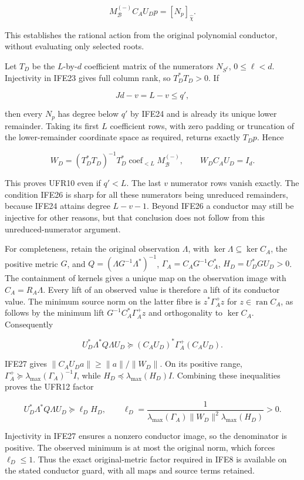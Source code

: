 \documentclass[11pt]{article}
\begin{document}
\[
M_{\mathcal B}^{(-)}C_AU_Dp=[N_p]_{\widehat\chi}.
\tag{IFE25}
\]

This establishes the rational action from the original polynomial conductor, without evaluating only selected roots.

Let \(T_D\) be the \(L\)-by-\(d\) coefficient matrix of the numerators \(N_{S^\ell}\), \(0\le\ell<d\). Injectivity in IFE23 gives full column rank, so \(T_D^*T_D>0\). If

\[
Jd-v=L-v\le q',
\tag{IFE26}
\]

then every \(N_p\) has degree below \(q'\) by IFE24 and is already its unique lower remainder. Taking its first \(L\) coefficient rows, with zero padding or truncation of the lower-remainder coordinate space as required, returns exactly \(T_Dp\). Hence

\[
W_D=(T_D^*T_D)^{-1}T_D^*
\operatorname{coef}_{<L}M_{\mathcal B}^{(-)},
\qquad \boxed{W_DC_AU_D=I_d.}
\tag{IFE27}
\]

This proves UFR10 even if \(q'<L\). The last \(v\) numerator rows vanish exactly. The condition IFE26 is sharp for all these numerators being unreduced remainders, because IFE24 attains degree \(L-v-1\). Beyond IFE26 a conductor may still be injective for other reasons, but that conclusion does not follow from this unreduced-numerator argument.

For completeness, retain the original observation \(\Lambda\), with \(\ker\Lambda\subseteq\ker C_A\), the positive metric \(G\), and \(Q=(\Lambda G^{-1}\Lambda^*)^{-1}\), \(\Gamma_A=C_AG^{-1}C_A^*\), \(H_D=U_D^*GU_D>0\). The containment of kernels gives a unique map on the observation image with \(C_A=R_A\Lambda\). Every lift of an observed value is therefore a lift of its conductor value. The minimum source norm on the latter fibre is \(z^*\Gamma_A^+z\) for \(z\in\operatorname{ran}C_A\), as follows by the minimum lift \(G^{-1}C_A^*\Gamma_A^+z\) and orthogonality to \(\ker C_A\). Consequently

\[
U_D^*\Lambda^*Q\Lambda U_D
\succeq(C_AU_D)^*\Gamma_A^+(C_AU_D).
\tag{IFE28}
\]

IFE27 gives \(\|C_AU_Da\|\ge\|a\|/\|W_D\|\). On its positive range, \(\Gamma_A^+\succeq\lambda_{\max}(\Gamma_A)^{-1}I\), while \(H_D\preceq\lambda_{\max}(H_D)I\). Combining these inequalities proves the UFR12 factor

\[
U_D^*\Lambda^*Q\Lambda U_D\succeq\ell_DH_D,
\qquad
\ell_D=\frac1{\lambda_{\max}(\Gamma_A)\|W_D\|^2\lambda_{\max}(H_D)}>0.
\tag{IFE29}
\]

Injectivity in IFE27 ensures a nonzero conductor image, so the denominator is positive. The observed minimum is at most the original norm, which forces \(\ell_D\le1\). Thus the exact original-metric factor required in IFE8 is available on the stated conductor guard, with all maps and source terms retained.
\end{document}
